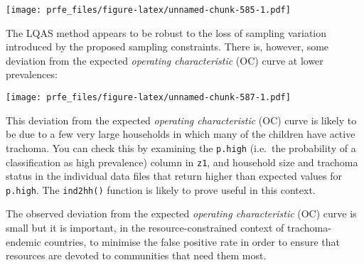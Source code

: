 \documentclass[
  12pt,
  a4paper]{book}
\newenvironment{Shaded}{\begin{snugshade}}{\end{snugshade}}
\newcommand{\AttributeTok}[1]{\textcolor[rgb]{0.77,0.63,0.00}{#1}}
\newcommand{\ConstantTok}[1]{\textcolor[rgb]{0.00,0.00,0.00}{#1}}
\newcommand{\DecValTok}[1]{\textcolor[rgb]{0.00,0.00,0.81}{#1}}
\newcommand{\FloatTok}[1]{\textcolor[rgb]{0.00,0.00,0.81}{#1}}
\newcommand{\FunctionTok}[1]{\textcolor[rgb]{0.00,0.00,0.00}{#1}}
\newcommand{\NormalTok}[1]{#1}
\newcommand{\SpecialCharTok}[1]{\textcolor[rgb]{0.00,0.00,0.00}{#1}}
\newcommand{\StringTok}[1]{\textcolor[rgb]{0.31,0.60,0.02}{#1}}
\begin{document}
\texttt{[image: prfe\_files/figure-latex/unnamed-chunk-585-1.pdf]}

The LQAS method appears to be robust to the loss of sampling variation introduced by the proposed sampling constraints. There is, however, some deviation from the expected \emph{operating characteristic} (OC) curve at lower prevalences:

\begin{Shaded}
\end{Shaded}

\texttt{[image: prfe\_files/figure-latex/unnamed-chunk-587-1.pdf]}

This deviation from the expected \emph{operating characteristic} (OC) curve is likely to be due to a few very large households in which many of the children have active trachoma. You can check this by examining the \texttt{p.high} (i.e.~the probability of a classification as high prevalence) column in \texttt{z1}, and household size and trachoma status in the individual data files that return higher than expected values for \texttt{p.high}. The \texttt{ind2hh()} function is likely to prove useful in this context.

The observed deviation from the expected \emph{operating characteristic} (OC) curve is small but it is important, in the resource-constrained context of trachoma-endemic countries, to minimise the false positive rate in order to ensure that resources are devoted to communities that need them most.
\end{document}
